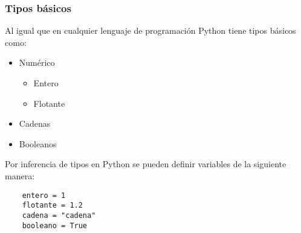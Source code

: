 \begin{frame}[fragile]
    \frametitle{Tipos b\'asicos}

    Al igual que en cualquier lenguaje de programaci\'on Python tiene
    tipos b\'asicos como:

    \begin{itemize}
        \item Num\'erico
            \begin{itemize}
                \item Entero
                \item Flotante
            \end{itemize}
        \item Cadenas
        \item Booleanos
    \end{itemize}

    Por inferencia de tipos en Python se pueden definir variables de la
    siguiente manera:

    \begin{lstlisting}
    entero = 1
    flotante = 1.2
    cadena = "cadena"
    booleano = True
    \end{lstlisting}

\end{frame}
